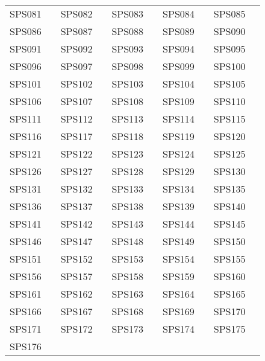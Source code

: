 \begin{table*}[htbp]
\begin{tabularx}{\textwidth}{c>{\centering\arraybackslash}X c>{\centering\arraybackslash}X c>{\centering\arraybackslash}X c>{\centering\arraybackslash}X c>{\centering\arraybackslash}X}
SPS081 & \cite{81} & SPS082 & \cite{82} & SPS083 & \cite{83} & SPS084 & \cite{84} & SPS085 & \cite{85} \\
SPS086 & \cite{86} & SPS087 & \cite{87} & SPS088 & \cite{88} & SPS089 & \cite{89} & SPS090 & \cite{90} \\
SPS091 & \cite{91} & SPS092 & \cite{92} & SPS093 & \cite{93} & SPS094 & \cite{94} & SPS095 & \cite{95} \\
SPS096 & \cite{96} & SPS097 & \cite{97} & SPS098 & \cite{98} & SPS099 & \cite{99} & SPS100 & \cite{100} \\
SPS101 & \cite{101} & SPS102 & \cite{102} & SPS103 & \cite{103} & SPS104 & \cite{104} & SPS105 & \cite{105} \\
SPS106 & \cite{106} & SPS107 & \cite{107} & SPS108 & \cite{108} & SPS109 & \cite{109} & SPS110 & \cite{110} \\
SPS111 & \cite{111} & SPS112 & \cite{112} & SPS113 & \cite{113} & SPS114 & \cite{114} & SPS115 & \cite{115} \\
SPS116 & \cite{116} & SPS117 & \cite{117} & SPS118 & \cite{118} & SPS119 & \cite{119} & SPS120 & \cite{120} \\
SPS121 & \cite{121} & SPS122 & \cite{122} & SPS123 & \cite{123} & SPS124 & \cite{124} & SPS125 & \cite{125} \\
SPS126 & \cite{126} & SPS127 & \cite{127} & SPS128 & \cite{128} & SPS129 & \cite{129} & SPS130 & \cite{130} \\
SPS131 & \cite{131} & SPS132 & \cite{132} & SPS133 & \cite{133} & SPS134 & \cite{134} & SPS135 & \cite{135} \\
SPS136 & \cite{136} & SPS137 & \cite{137} & SPS138 & \cite{138} & SPS139 & \cite{139} & SPS140 & \cite{140} \\
SPS141 & \cite{141} & SPS142 & \cite{142} & SPS143 & \cite{143} & SPS144 & \cite{144} & SPS145 & \cite{145} \\
SPS146 & \cite{146} & SPS147 & \cite{147} & SPS148 & \cite{148} & SPS149 & \cite{149} & SPS150 & \cite{150} \\
SPS151 & \cite{151} & SPS152 & \cite{152} & SPS153 & \cite{153} & SPS154 & \cite{154} & SPS155 & \cite{155} \\
SPS156 & \cite{156} & SPS157 & \cite{157} & SPS158 & \cite{158} & SPS159 & \cite{159} & SPS160 & \cite{160} \\
SPS161 & \cite{161} & SPS162 & \cite{162} & SPS163 & \cite{163} & SPS164 & \cite{164} & SPS165 & \cite{165} \\
SPS166 & \cite{166} & SPS167 & \cite{167} & SPS168 & \cite{168} & SPS169 & \cite{169} & SPS170 & \cite{170} \\
SPS171 & \cite{171} & SPS172 & \cite{172} & SPS173 & \cite{173} & SPS174 & \cite{174} & SPS175 & \cite{175} \\
SPS176 & \cite{176} \\
\end{tabularx}
\end{table*}